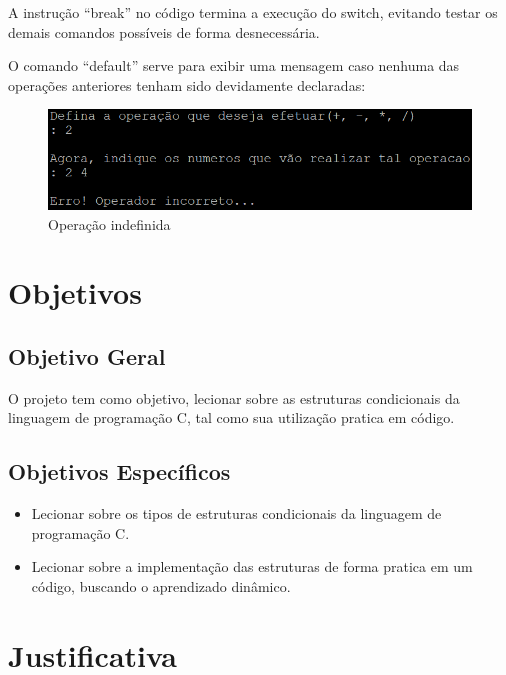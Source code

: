 \documentclass[a4paper,12pt]{article}  %
\begin{document}
     A instrução “break” no código termina a execução do switch, evitando testar os demais comandos possíveis de forma desnecessária. \par
     O comando “default” serve para exibir uma mensagem caso nenhuma das operações anteriores tenham sido devidamente declaradas:


 \begin{figure}[H]
 \centering
 \includegraphics[width=.80\linewidth]{imagens/ex7.png}
 \caption{Operação indefinida}
\end{figure}


\section{Objetivos}

 \subsection{Objetivo Geral}

  O projeto tem como objetivo, lecionar sobre as estruturas condicionais da linguagem de programação C, tal como sua utilização pratica em código. 

 \subsection{Objetivos Específicos}

\begin{itemize}
 \item Lecionar sobre os tipos de estruturas condicionais da linguagem de programação C.
 \item Lecionar sobre a implementação das estruturas de forma pratica em um código, buscando o aprendizado dinâmico.  
\end{itemize}


\section{Justificativa}
\end{document}
